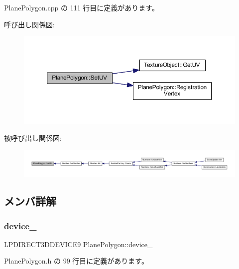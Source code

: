  Plane\+Polygon.\+cpp の 111 行目に定義があります。

呼び出し関係図\+:\nopagebreak
\begin{figure}[H]
\begin{center}
\leavevmode
\includegraphics[width=350pt]{class_plane_polygon_a081458fcb9e758dd8be5b027c66a92ad_cgraph}
\end{center}
\end{figure}
被呼び出し関係図\+:\nopagebreak
\begin{figure}[H]
\begin{center}
\leavevmode
\includegraphics[width=350pt]{class_plane_polygon_a081458fcb9e758dd8be5b027c66a92ad_icgraph}
\end{center}
\end{figure}


\subsection{メンバ詳解}
\mbox{\label{class_plane_polygon_a9b07736e5b36983967d0fac67c39dc82}} 
\subsubsection{\texorpdfstring{device\+\_\+}{device\_}}
{\footnotesize\ttfamily L\+P\+D\+I\+R\+E\+C\+T3\+D\+D\+E\+V\+I\+C\+E9 Plane\+Polygon\+::device\+\_\+\hspace{0.3cm}{\ttfamily [private]}}



 Plane\+Polygon.\+h の 99 行目に定義があります。

\mbox{\label{class_plane_polygon_a75b4c7fca8f0b25f11bd59da087b5a07}} 
